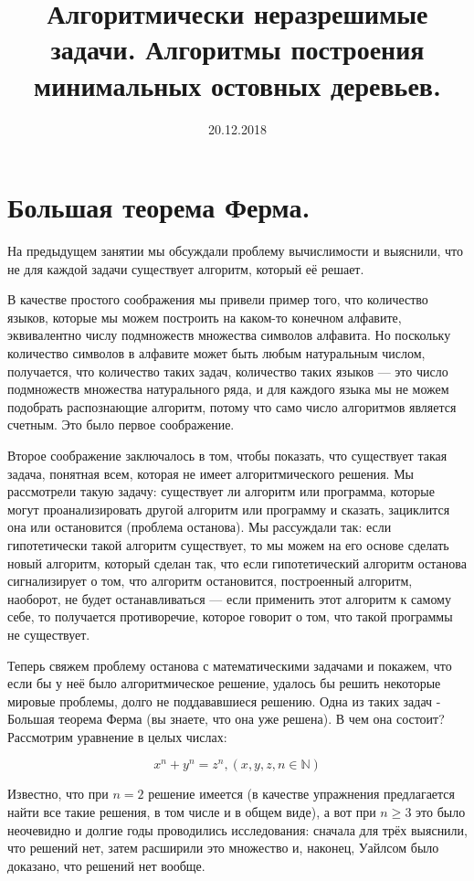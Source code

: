 \documentclass[russian]{lecture-notes}
\title{Алгоритмически неразрешимые задачи. Алгоритмы построения минимальных остовных деревьев.}
\date{20.12.2018}
\begin{document}
	
	\maketitle
	\section*{Большая теорема Ферма.}
	На предыдущем занятии мы обсуждали проблему вычислимости и выяснили, что не для каждой задачи существует алгоритм, который её решает. 
	
	В качестве простого соображения мы привели пример того, что количество языков, которые мы можем построить на каком-то конечном алфавите, эквивалентно числу подмножеств множества символов алфавита. Но поскольку количество символов в алфавите может быть любым натуральным числом, получается, что количество таких задач, количество таких языков --- это число подмножеств множества натурального ряда, и для каждого языка мы не можем подобрать распознающие алгоритм, потому что само число алгоритмов является счетным. Это было первое соображение.
	
	Второе соображение заключалось в том, чтобы показать, что существует такая задача, понятная всем, которая не имеет алгоритмического решения. Мы рассмотрели такую задачу: существует ли алгоритм или программа, которые могут проанализировать другой алгоритм или программу и сказать, зациклится она или остановится (проблема останова). Мы рассуждали так: если гипотетически такой алгоритм  существует, то мы можем на его основе сделать новый алгоритм, который сделан так, что если гипотетический алгоритм останова сигнализирует о том, что алгоритм остановится, построенный алгоритм, наоборот, не будет останавливаться --- если применить этот алгоритм к самому себе, то получается противоречие, которое говорит о том, что такой программы не существует. 
	
	Теперь свяжем проблему останова с математическими задачами и покажем, что если бы у неё было алгоритмическое решение, удалось бы решить некоторые мировые проблемы, долго не поддававшиеся решению. Одна из таких задач - Большая теорема Ферма (вы знаете, что она уже решена). В чем она состоит? Рассмотрим уравнение в целых числах:
	
	\[
	x^n + y^n = z^n, 		(x, y, z, n \in \mathbb{N})
	\]
	
	Известно, что при $n = 2$ решение имеется (в качестве упражнения предлагается найти все такие решения, в том числе и в общем виде), а вот при $n \geq 3$ это было неочевидно и долгие годы проводились исследования: сначала для трёх выяснили, что решений нет, затем расширили это множество и, наконец, Уайлсом было доказано, что решений нет вообще.
	
\end{document}
